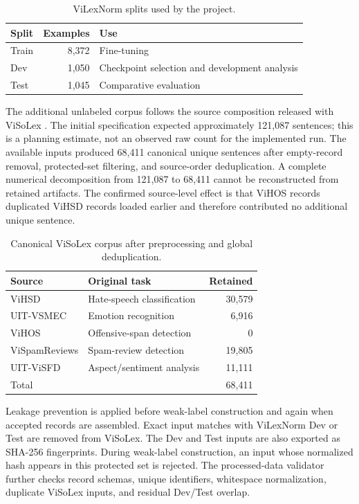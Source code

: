 \documentclass[11pt]{article}
\begin{document}
\begin{table}[t]
\centering
\caption{ViLexNorm splits used by the project.}
\label{tab:vilexnorm-splits}
\begin{tabular}{lrl}
\toprule
Split & Examples & Use \\
\midrule
Train & 8,372 & Fine-tuning \\
Dev & 1,050 & Checkpoint selection and development analysis \\
Test & 1,045 & Comparative evaluation \\
\bottomrule
\end{tabular}
\end{table}

The additional unlabeled corpus follows the source composition released with ViSoLex \citep{nguyen2025visolex}. The initial specification expected approximately 121,087 sentences; this is a planning estimate, not an observed raw count for the implemented run. The available inputs produced 68,411 canonical unique sentences after empty-record removal, protected-set filtering, and source-order deduplication. A complete numerical decomposition from 121,087 to 68,411 cannot be reconstructed from retained artifacts. The confirmed source-level effect is that ViHOS records duplicated ViHSD records loaded earlier and therefore contributed no additional unique sentence.

\begin{table}[t]
\centering
\caption{Canonical ViSoLex corpus after preprocessing and global deduplication.}
\label{tab:visolex-sources}
\begin{tabular}{llr}
\toprule
Source & Original task & Retained \\
\midrule
ViHSD \citep{luu2021vihsd} & Hate-speech classification & 30,579 \\
UIT-VSMEC \citep{ho2020vsmec} & Emotion recognition & 6,916 \\
ViHOS \citep{hoang2023vihos} & Offensive-span detection & 0 \\
ViSpamReviews \citep{vandinh2022vispam} & Spam-review detection & 19,805 \\
UIT-ViSFD \citep{phan2021visfd} & Aspect/sentiment analysis & 11,111 \\
\midrule
Total & & 68,411 \\
\bottomrule
\end{tabular}
\end{table}

Leakage prevention is applied before weak-label construction and again when accepted records are assembled. Exact input matches with ViLexNorm Dev or Test are removed from ViSoLex. The Dev and Test inputs are also exported as SHA-256 fingerprints. During weak-label construction, an input whose normalized hash appears in this protected set is rejected. The processed-data validator further checks record schemas, unique identifiers, whitespace normalization, duplicate ViSoLex inputs, and residual Dev/Test overlap.
\end{document}

